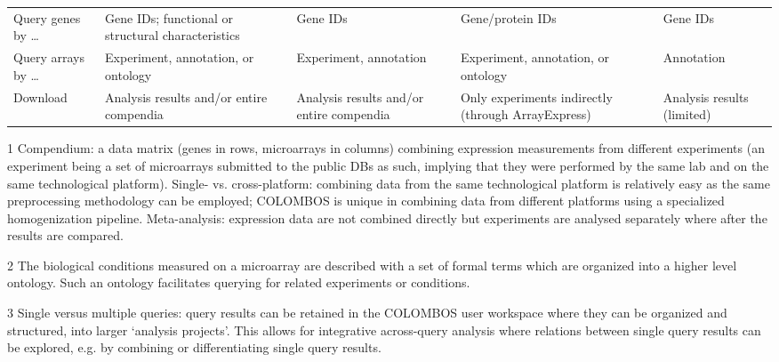 \begin{table}
\begin{threeparttable}
\begin{footnotesize}
\begin{tabular}{p{2cm} p{2.2cm} p{2cm} p{2cm} p{2.3cm}}
		Query genes by \ldots & Gene IDs; functional or structural 
		characteristics & Gene IDs & Gene/protein IDs & Gene IDs \\[1ex] 
		
		Query arrays by \ldots & Experiment, annotation, or ontology & 
		Experiment, annotation & Experiment, annotation, or ontology & 
		Annotation \\[1ex] 
		
		Download & Analysis results and/or entire compendia & Analysis results 
		and/or entire compendia & Only experiments indirectly (through 
		ArrayExpress) & Analysis results (limited) \\
		\bottomrule 
	\end{tabular}
	\begin{tablenotes}
		\item[1] Compendium: a data matrix (genes in rows, microarrays in 
		columns) combining expression measurements from different experiments 
		(an experiment being a set of microarrays submitted to the public DBs 
		as such, implying that they were performed by the same lab and on the 
		same technological platform). Single- vs. cross-platform: combining 
		data from the same technological platform is relatively easy as the 
		same preprocessing methodology can be employed; COLOMBOS is unique in 
		combining data from different platforms using a specialized 
		homogenization pipeline. Meta-analysis: expression data are not 
		combined directly but experiments are analysed separately where after 
		the results are compared.
		\item[2] The biological conditions measured on a microarray are 
		described with a set of formal terms which are organized into a higher 
		level ontology. Such an ontology facilitates querying for related 
		experiments or conditions.
		\item[3] Single versus multiple queries: query results can be retained 
		in the COLOMBOS user workspace where they can be organized and 
		structured, into larger `analysis projects'. This allows for 
		integrative across-query analysis where relations between single query 
		results can be explored, e.g. by combining or differentiating single 
		query results.
	\end{tablenotes}
	\end{footnotesize}
	\end{threeparttable}
\end{table}


